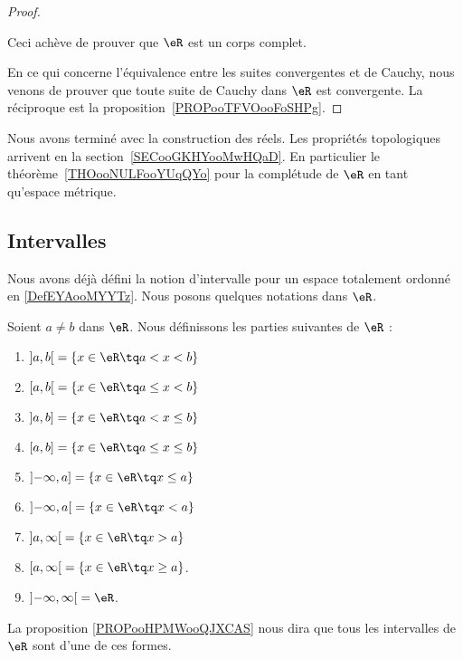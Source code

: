 \begin{proof}
\begin{subproof}
		Ceci achève de prouver que \( \eR\) est un corps complet.
	\end{subproof}

	En ce qui concerne l'équivalence entre les suites convergentes et de Cauchy, nous venons de prouver que toute suite de Cauchy dans \( \eR\) est convergente. La réciproque est la proposition~\ref{PROPooTFVOooFoSHPg}.

\end{proof}

Nous avons terminé avec la construction des réels. Les propriétés topologiques arrivent en la section~\ref{SECooGKHYooMwHQaD}. En particulier le théorème~\ref{THOooNULFooYUqQYo} pour la complétude de \( \eR\) en tant qu'espace métrique.

\subsection{Intervalles}

Nous avons déjà défini la notion d'intervalle pour un espace totalement ordonné en \ref{DefEYAooMYYTz}. Nous posons quelques notations dans \( \eR\).

\begin{definition}  \label{DEFooAQBUooKLChOW}
	Soient \( a\neq b\) dans \( \eR\). Nous définissons les parties suivantes de \( \eR\) :
	\begin{enumerate}
		\item
		      \( \mathopen] a , b \mathclose[=\{ x\in \eR\tq a<x<b \}\)
		\item
		      \( \mathopen[ a , b \mathclose[=\{ x\in \eR\tq a\leq x<b \}\)
		\item
		      \( \mathopen] a , b \mathclose]=\{ x\in \eR\tq a<x\leq b \}\)
		\item
		      \( \mathopen[ a , b \mathclose]=\{ x\in \eR\tq a\leq x\leq b \}\)
		\item
		      \( \mathopen]-\infty , a \mathclose]=\{ x\in \eR\tq x\leq a \}\)
		\item
		      \( \mathopen]-\infty , a \mathclose[=\{ x\in \eR\tq x< a \}\)
		\item
		      \( \mathopen] a , \infty \mathclose[=\{ x\in \eR\tq x>a \}\)
		\item
		      \( \mathopen[ a , \infty \mathclose[=\{ x\in \eR\tq x\geq a \}\).
		\item
		      \( \mathopen] -\infty , \infty \mathclose[=\eR\).
	\end{enumerate}
	La proposition \ref{PROPooHPMWooQJXCAS} nous dira que tous les intervalles de \( \eR\) sont d'une de ces formes.
\end{definition}

